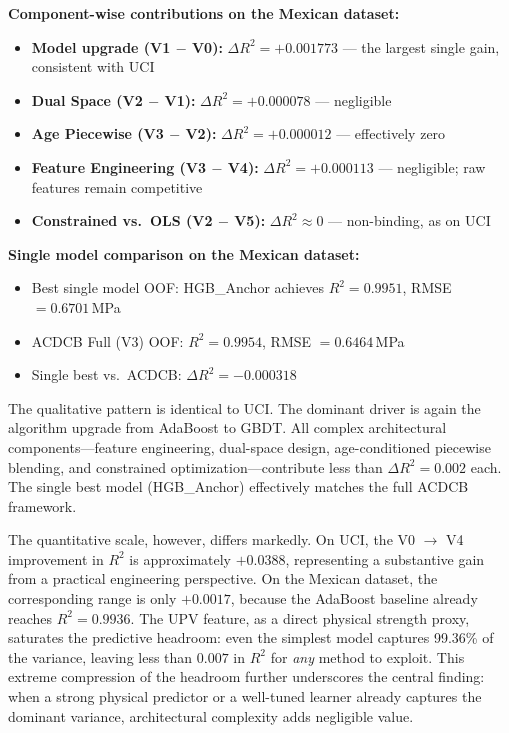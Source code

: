 \documentclass[journal]{IEEEtran}
\begin{document}
\noindent\textbf{Component-wise contributions on the Mexican dataset:}
\begin{itemize}
\item \textbf{Model upgrade (V1 $-$ V0):} $\Delta R^2 = +0.001773$ --- the largest single gain, consistent with UCI
\item \textbf{Dual Space (V2 $-$ V1):} $\Delta R^2 = +0.000078$ --- negligible
\item \textbf{Age Piecewise (V3 $-$ V2):} $\Delta R^2 = +0.000012$ --- effectively zero
\item \textbf{Feature Engineering (V3 $-$ V4):} $\Delta R^2 = +0.000113$ --- negligible; raw features remain competitive
\item \textbf{Constrained vs.\ OLS (V2 $-$ V5):} $\Delta R^2 \approx 0$ --- non-binding, as on UCI
\end{itemize}

\noindent\textbf{Single model comparison on the Mexican dataset:}
\begin{itemize}
\item Best single model OOF: HGB\_Anchor achieves $R^2 = 0.9951$, RMSE $= 0.6701$\,MPa
\item ACDCB Full (V3) OOF: $R^2 = 0.9954$, RMSE $= 0.6464$\,MPa
\item Single best vs.\ ACDCB: $\Delta R^2 = -0.000318$
\end{itemize}

The qualitative pattern is identical to UCI. The dominant driver is again the algorithm upgrade from AdaBoost to GBDT. All complex architectural components---feature engineering, dual-space design, age-conditioned piecewise blending, and constrained optimization---contribute less than $\Delta R^2 = 0.002$ each. The single best model (HGB\_Anchor) effectively matches the full ACDCB framework.

The quantitative scale, however, differs markedly. On UCI, the V0 $\to$ V4 improvement in $R^2$ is approximately $+0.0388$, representing a substantive gain from a practical engineering perspective. On the Mexican dataset, the corresponding range is only $+0.0017$, because the AdaBoost baseline already reaches $R^2 = 0.9936$. The UPV feature, as a direct physical strength proxy, saturates the predictive headroom: even the simplest model captures 99.36\% of the variance, leaving less than $0.007$ in $R^2$ for \emph{any} method to exploit. This extreme compression of the headroom further underscores the central finding: when a strong physical predictor or a well-tuned learner already captures the dominant variance, architectural complexity adds negligible value.
\end{document}
